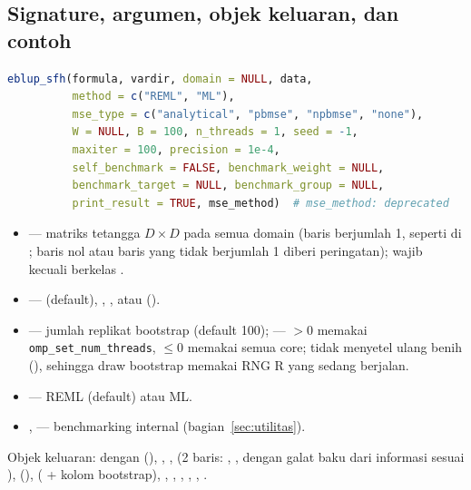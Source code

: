 \subsection{Signature, argumen, objek keluaran, dan contoh}\label{sec:sfh-api}

\begin{lstlisting}[language=R,caption={Signature \texttt{eblup\_sfh} (\texttt{R/eblup\_sfh.R:131-149}).}]
eblup_sfh(formula, vardir, domain = NULL, data,
          method = c("REML", "ML"),
          mse_type = c("analytical", "pbmse", "npbmse", "none"),
          W = NULL, B = 100, n_threads = 1, seed = -1,
          maxiter = 100, precision = 1e-4,
          self_benchmark = FALSE, benchmark_weight = NULL,
          benchmark_target = NULL, benchmark_group = NULL,
          print_result = TRUE, mse_method)  # mse_method: deprecated
\end{lstlisting}

\begin{itemize}
  \item {} --- matriks tetangga $D\times D$ pada semua domain
        (baris berjumlah 1, seperti di ; baris nol atau baris yang
        tidak berjumlah 1 diberi peringatan); wajib kecuali
         berkelas .
  \item {} ---  (default), ,
        , atau  ().
  \item {} --- jumlah replikat bootstrap (default 100);
         --- $>0$ memakai \texttt{omp\_set\_num\_threads},
        $\le0$ memakai semua core;  tidak menyetel ulang
        benih (), sehingga draw bootstrap
        memakai RNG R yang sedang berjalan.
  \item {} --- REML (default) atau ML.
  \item {},  --- benchmarking internal
        (bagian~\ref{sec:utilitas}).
\end{itemize}

Objek keluaran:  dengan 
(), ,
,  (2 baris: , , dengan
galat baku dari informasi sesuai ), 
(),  ( + kolom bootstrap), , ,
, , , .

